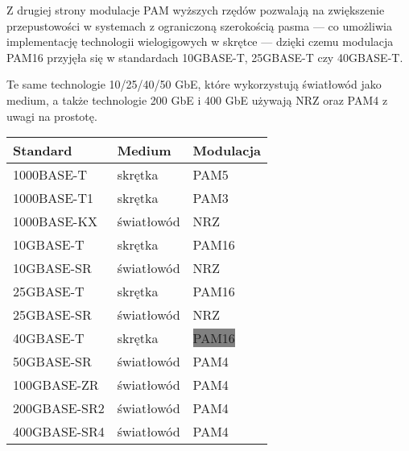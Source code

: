 Z drugiej strony modulacje PAM wyższych rzędów pozwalają na zwiększenie przepustowości w systemach z ograniczoną szerokością pasma --- co
umożliwia implementację technologii wielogigowych w skrętce --- dzięki czemu modulacja PAM16 przyjęła się w standardach 10GBASE-T, 25GBASE-T czy 40GBASE-T.

Te same technologie 10/25/40/50 GbE, które wykorzystują światłowód jako medium, a także technologie 200 GbE i 400 GbE używają NRZ oraz PAM4 z uwagi na prostotę.

\begingroup
{}
\begin{table}[h]
\centering
    \begin{tabular}{m{3cm} m{3cm} m{3cm}}
    \toprule
    Standard & Medium & Modulacja \\
    \midrule
    1000BASE-T & skrętka & PAM5 \\
    \midrule
    1000BASE-T1 & skrętka & PAM3 \\
    \midrule
    1000BASE-KX & światłowód & NRZ \\
    \midrule
    10GBASE-T & skrętka & PAM16 \\
    \midrule
    10GBASE-SR & światłowód & NRZ \\
    \midrule
    25GBASE-T & skrętka & PAM16 \\
    \midrule
    25GBASE-SR & światłowód & NRZ \\
    \midrule
    40GBASE-T & skrętka & \colorbox{gray}{PAM16} \\
    \midrule
    50GBASE-SR & światłowód & PAM4 \\
    \midrule
    100GBASE-ZR & światłowód & PAM4 \\
    \midrule
    200GBASE-SR2 & światłowód & PAM4 \\
    \midrule
    400GBASE-SR4 & światłowód & PAM4 \\
    \bottomrule
    \end{tabular}
\end{table}
\endgroup

